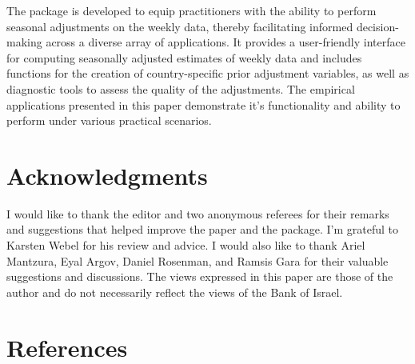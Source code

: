 The package  is developed to equip practitioners with the ability to perform seasonal adjustments on the weekly data, thereby facilitating informed decision-making across a diverse array of applications. It provides a user-friendly interface for computing seasonally adjusted estimates of weekly data and includes functions for the creation of country-specific prior adjustment variables, as well as diagnostic tools to assess the quality of the adjustments. The empirical applications presented in this paper demonstrate it's functionality and ability to perform under various practical scenarios.

\hypertarget{acknowledgments}{%
\section*{Acknowledgments}\label{acknowledgments}}

I would like to thank the editor and two anonymous referees for their remarks and suggestions that helped improve the paper and the package. I'm grateful to Karsten Webel for his review and advice. I would also like to thank Ariel Mantzura, Eyal Argov, Daniel Rosenman, and Ramsis Gara for their valuable suggestions and discussions. The views expressed in this paper are those of the author and do not necessarily reflect the views of the Bank of Israel.

\hypertarget{references}{%
\section*{References}\label{references}}

